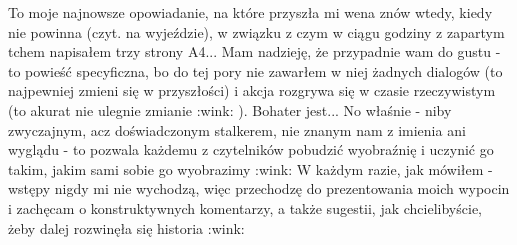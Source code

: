 \documentclass[../MAIN.tex]{subfiles}
\begin{document}
To moje najnowsze opowiadanie, na które przyszła mi wena znów
wtedy, kiedy nie powinna (czyt. na wyjeździe), w związku z czym
w ciągu godziny z zapartym tchem napisałem trzy strony A4...
Mam nadzieję, że przypadnie wam do gustu - to powieść
specyficzna, bo do tej pory nie zawarłem w niej żadnych
dialogów (to najpewniej zmieni się w przyszłości) i akcja
rozgrywa się w czasie rzeczywistym (to akurat nie ulegnie
zmianie :wink: ). Bohater jest... No właśnie - niby zwyczajnym,
acz doświadczonym stalkerem, nie znanym nam z imienia ani
wyglądu - to pozwala każdemu z czytelników pobudzić wyobraźnię
i uczynić go takim, jakim sami sobie go wyobrazimy :wink: W
każdym razie, jak mówiłem - wstępy nigdy mi nie wychodzą, więc
przechodzę do prezentowania moich wypocin i zachęcam o
konstruktywnych komentarzy, a także sugestii, jak
chcielibyście, żeby dalej rozwinęła się historia :wink:
\end{document}
